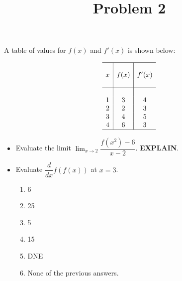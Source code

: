 \documentclass{ximera}
\title[Problem 2]{Problem 2}
\begin{document}
\begin{abstract} \end{abstract}
\maketitle

\begin{problem}
 A table of values for $f(x)$ and $f'(x)$ is shown below:


$$\begin{array}{c|c|c}
	\hline
	& & \\
	x & f(x) & f'(x) \\
	& & \\
	\hline
	& & \\
	1 & 3 & 4\\
	2 & 2 & 3\\
	3 & 4 & 5\\
	4 & 6 & 3\\
	\hline
\end{array} $$

	\begin{itemize}
		\item	Evaluate the limit $\displaystyle \lim_{x \to 2} \dfrac{f(x^2)-6}{x-2}$. \textbf{EXPLAIN}.
\item Evaluate $\displaystyle\dfrac{d}{dx} f(f(x))$ at $x = 3$.
		  \begin{enumerate}
			    \item 6
			    \item 25
			    \item 5
			    \item 15
			    \item DNE
			    \item None of the previous answers.
			  \end{enumerate}
\end{itemize}

\end{problem}
\end{document}
